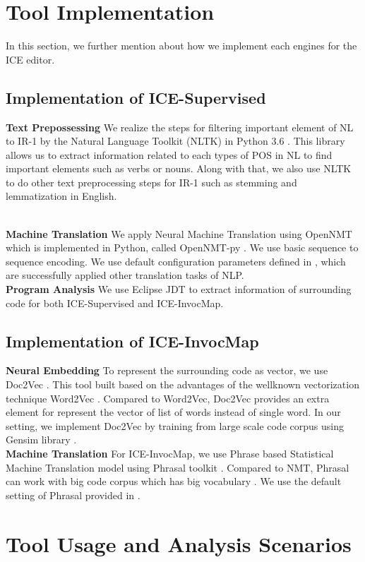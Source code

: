 \documentclass[sigconf,review]{acmart}
\begin{document}
\section{Tool Implementation}
In this section, we further mention about how we implement each engines for the ICE editor.
\subsection{Implementation of ICE-Supervised}
\textbf{Text Prepossessing} We realize the steps for filtering important element of NL to IR-1 by the Natural Language Toolkit (NLTK) in Python 3.6 \cite{039}. This library allows us to extract information related to each types of POS in NL to find important elements such as verbs or nouns. Along with that, we also use NLTK to do other text preprocessing steps for IR-1 such as stemming and lemmatization in English.

\\
\textbf{Machine Translation} We apply Neural Machine Translation using OpenNMT which is implemented in Python, called OpenNMT-py \cite{038}. We use basic sequence to sequence encoding. We use default configuration parameters defined in \cite{038}, which are successfully applied other translation tasks of NLP.
\\
\textbf{Program Analysis} We use Eclipse JDT \cite{040} to extract information of surrounding code for both ICE-Supervised and ICE-InvocMap.

\subsection{Implementation of ICE-InvocMap}
\textbf{Neural Embedding} To represent the surrounding code as vector, we use Doc2Vec \cite{002}. This tool built based on the advantages of the wellknown vectorization technique Word2Vec \cite{014}. Compared to Word2Vec, Doc2Vec provides an extra element for represent the vector of list of words instead of single word. In our setting, we implement Doc2Vec by training from large scale code corpus using Gensim library \cite{023}.
\\
\textbf{Machine Translation} For ICE-InvocMap, we use Phrase based Statistical Machine Translation model using Phrasal toolkit \cite{015,016}. Compared to NMT, Phrasal can work with big code corpus which has big vocabulary \cite{013}. We use the default setting of Phrasal provided in \cite{015}.

\section{Tool Usage and Analysis Scenarios}
\end{document}
